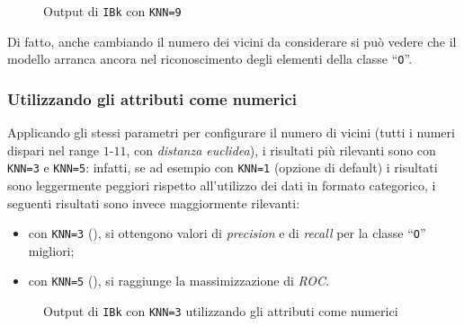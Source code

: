 
\begin{figure}[H]
  \centering
  \caption{Output di \texttt{IBk} con \texttt{KNN=9}}%
  \label{fig:ibk:9}
\end{figure}

Di fatto, anche cambiando il numero dei vicini da considerare si può vedere che il modello arranca ancora nel riconoscimento degli elementi della classe ``\texttt{O}''.

\subsubsection{Utilizzando gli attributi come numerici}

Applicando gli stessi parametri per configurare il numero di vicini (tutti i numeri dispari nel range \(1\)-\(11\), con \emph{distanza euclidea}), i risultati più rilevanti sono con \texttt{KNN=3} e \texttt{KNN=5}:
infatti, se ad esempio con \texttt{KNN=1} (opzione di default) i risultati sono leggermente peggiori rispetto all'utilizzo dei dati in formato categorico, i seguenti risultati sono invece maggiormente rilevanti:

\begin{itemize}
  \item con \texttt{KNN=3} (), si ottengono valori di \emph{precision} e di \emph{recall} per la classe ``\texttt{O}'' migliori;
  \item con \texttt{KNN=5} (), si raggiunge la massimizzazione di \emph{ROC}.
\end{itemize}


\begin{figure}[H]
  \centering
  \caption{Output di \texttt{IBk} con \texttt{KNN=3} utilizzando gli attributi come numerici}%
  \label{fig:ibk:3-num}
\end{figure}

